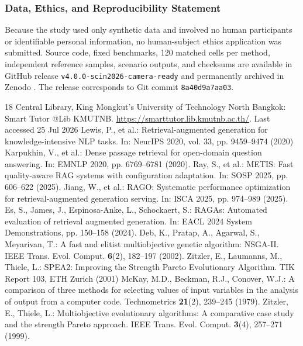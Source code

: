 \documentclass[runningheads]{llncs}
\newcommand{\artifactrelease}{v4.0.0-scin2026-camera-ready}
\newcommand{\artifactcommit}{8a40d9a7aa03}
\begin{document}
\subsubsection{Data, Ethics, and Reproducibility Statement}
Because the study used only synthetic data and involved no human participants or identifiable personal information, no human-subject ethics application was submitted. Source code, fixed benchmarks, 120 matched cells per method, independent reference samples, scenario outputs, and checksums are available in GitHub release \texttt{\artifactrelease} and permanently archived in Zenodo \cite{artifact}. The release corresponds to Git commit \texttt{\artifactcommit}.

\begin{thebibliography}{18}
 Central Library, King Mongkut's University of Technology North Bangkok: Smart Tutor @Lib KMUTNB. \url{https://smarttutor.lib.kmutnb.ac.th/}. Last accessed 25 Jul 2026
 Lewis, P., et al.: Retrieval-augmented generation for knowledge-intensive NLP tasks. In: NeurIPS 2020, vol. 33, pp. 9459--9474 (2020)
 Karpukhin, V., et al.: Dense passage retrieval for open-domain question answering. In: EMNLP 2020, pp. 6769--6781 (2020). 
 Ray, S., et al.: METIS: Fast quality-aware RAG systems with configuration adaptation. In: SOSP 2025, pp. 606--622 (2025). 
 Jiang, W., et al.: RAGO: Systematic performance optimization for retrieval-augmented generation serving. In: ISCA 2025, pp. 974--989 (2025). 
 Es, S., James, J., Espinosa-Anke, L., Schockaert, S.: RAGAs: Automated evaluation of retrieval augmented generation. In: EACL 2024 System Demonstrations, pp. 150--158 (2024). 
 Deb, K., Pratap, A., Agarwal, S., Meyarivan, T.: A fast and elitist multiobjective genetic algorithm: NSGA-II. IEEE Trans. Evol. Comput. \textbf{6}(2), 182--197 (2002). 
 Zitzler, E., Laumanns, M., Thiele, L.: SPEA2: Improving the Strength Pareto Evolutionary Algorithm. TIK Report 103, ETH Zurich (2001)
 McKay, M.D., Beckman, R.J., Conover, W.J.: A comparison of three methods for selecting values of input variables in the analysis of output from a computer code. Technometrics \textbf{21}(2), 239--245 (1979). 
 Zitzler, E., Thiele, L.: Multiobjective evolutionary algorithms: A comparative case study and the strength Pareto approach. IEEE Trans. Evol. Comput. \textbf{3}(4), 257--271 (1999). 

\end{thebibliography}
\end{document}
